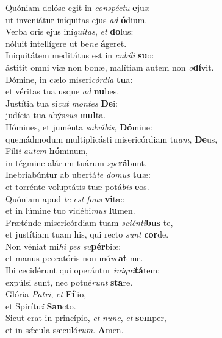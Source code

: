 \evenverse Quóniam dolóse egit in \textit{con}\textit{spé}\textit{ctu} \textbf{e}jus:~\*\\
\evenverse ut inveniátur iníquitas ejus \textit{ad} \textbf{ó}dium.\\
\oddverse Verba oris ejus iní\textit{qui}\textit{tas}, \textit{et} \textbf{do}lus:~\*\\
\oddverse nóluit intellígere ut be\textit{ne} \textbf{á}geret.\\
\evenverse Iniquitátem meditátus est in \textit{cu}\textit{bí}\textit{li} \textbf{su}o:~\*\\
\evenverse ástitit omni viæ non bonæ, malítiam autem non \textit{o}\textbf{dí}vit.\\
\oddverse Dómine, in cælo miseri\textit{cór}\textit{di}\textit{a} \textbf{tu}a:~\*\\
\oddverse et véritas tua usque \textit{ad} \textbf{nu}bes.\\
\evenverse Justítia tua si\textit{cut} \textit{mon}\textit{tes} \textbf{De}i:~\*\\
\evenverse judícia tua abýs\textit{sus} \textbf{mul}ta.\\
\oddverse Hómines, et juménta \textit{sal}\textit{vá}\textit{bis}, \textbf{Dó}mine:~\*\\
\oddverse quemádmodum multiplicásti misericórdiam tu\textit{am}, \textbf{De}us,\\
\evenverse Fíli\textit{i} \textit{au}\textit{tem} \textbf{hó}minum,~\*\\
\evenverse in tégmine alárum tuárum \textit{spe}\textbf{rá}bunt.\\
\oddverse Inebriabúntur ab ubertá\textit{te} \textit{do}\textit{mus} \textbf{tu}æ:~\*\\
\oddverse et torrénte voluptátis tuæ potá\textit{bis} \textbf{e}os.\\
\evenverse Quóniam apud \textit{te} \textit{est} \textit{fons} \textbf{vi}tæ:~\*\\
\evenverse et in lúmine tuo vidébi\textit{mus} \textbf{lu}men.\\
\oddverse Præténde misericórdiam tuam \textit{sci}\textit{én}\textit{ti}\textbf{bus} te,~\*\\
\oddverse et justítiam tuam his, qui recto \textit{sunt} \textbf{cor}de.\\
\evenverse Non véniat mi\textit{hi} \textit{pes} \textit{su}\textbf{pér}biæ:~\*\\
\evenverse et manus peccatóris non mó\textit{ve}\textbf{at} me.\\
\oddverse Ibi cecidérunt qui operántur \textit{i}\textit{ni}\textit{qui}\textbf{tá}tem:~\*\\
\oddverse expúlsi sunt, nec potué\textit{runt} \textbf{sta}re.\\
\evenverse Glória \textit{Pa}\textit{tri}, \textit{et} \textbf{Fí}lio,~\*\\
\evenverse et Spirítu\textit{i} \textbf{San}cto.\\
\oddverse Sicut erat in princípio, \textit{et} \textit{nunc}, \textit{et} \textbf{sem}per,~\*\\
\oddverse et in sǽcula sæculó\textit{rum}. \textbf{A}men.\\
